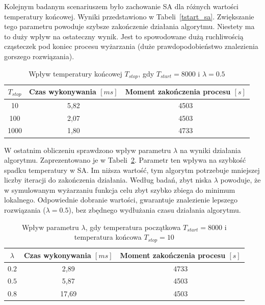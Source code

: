 Kolejnym badanym scenariuszem było zachowanie SA dla różnych wartości temperatury końcowej. Wyniki przedstawiono w Tabeli~\ref{tstart_sa}. Zwiększanie tego parametru powoduje szybsze zakończenie działania algorytmu. Niestety ma to duży wpływ na ostateczny wynik. Jest to spowodowane dużą ruchliwością cząsteczek pod koniec procesu wyżarzania (duże prawdopodobieństwo znalezienia gorszego rozwiązania).
\begin{table}[H]
	\centering
	\caption{Wpływ temperatury końcowej $T_{stop}$, gdy $T_{start}=8000$ i $\lambda=0.5$}
	\label{tstop_sa}
	\begin{tabular}{ccc}
		\toprule
		$T_{stop}$ & Czas wykonywania $[ms]$ & Moment zakończenia procesu $[s]$ \\
		\midrule
		10         & 5,82                    & 4503                              \\
		100        & 2,07                    & 4503                              \\
		1000       & 1,80                    & 4733                              \\
		\bottomrule
	\end{tabular}
\end{table}

W ostatnim obliczeniu sprawdzono wpływ parametru $\lambda$ na wyniki działania algorytmu. Zaprezentowano je w Tabeli~\ref{lamda_sa}. Parametr ten wpływa na szybkość spadku temperatury w SA\@. Im niższa wartość, tym algorytm potrzebuje mniejszej liczby iteracji do zakończenia działania.
Według badań, zbyt niska $\lambda$ powoduje, że w symulowanym wyżarzaniu funkcja celu zbyt szybko zbiega do minimum lokalnego.
Odpowiednie dobranie wartości, gwarantuje znalezienie lepszego rozwiązania ($\lambda = 0.5$), bez zbędnego wydłużania czasu działania algorytmu.

\begin{table}[H]
	\centering
	\caption{Wpływ parametru $\lambda$, gdy temperatura początkowa $T_{start}=8000$ i temperatura końcowa $T_{stop}=10$}
	\label{lamda_sa}
	\begin{tabular}{ccc}
		\toprule
		$\lambda$ & Czas wykonywania $[ms]$ & Moment zakończenia procesu $[s]$ \\
		\midrule
		$0.2$     & 2,89                    & 4733                              \\
		$0.5$     & 5,87                    & 4503                              \\
		$0.8$     & 17,69                   & 4503                              \\
		\bottomrule
	\end{tabular}
\end{table}


